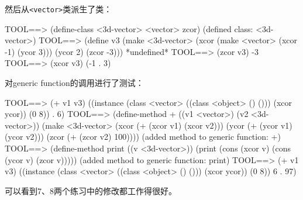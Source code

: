 \documentclass[a4paper]{article}
\newcommand{\code}[1]{\mbox{\tt #1}}
\begin{document}
然后从\code{<vector>}类派生了\code{<3d-vector>}类：

\beginlisp
TOOL==> (define-class <3d-vector> <vector> zcor)
(defined class: <3d-vector>)
\null
TOOL==> (define v3
          (make <3d-vector>
                (xcor (make <vector> (xcor -1) (ycor 3)))
                (ycor 2)
                (zcor -3)))
*undefined*
\null
TOOL==> (zcor v3)
-3
\null
TOOL==> (xcor v3)
(-1 . 3)
\null
\endlisp

对generic function的调用进行了测试：

\beginlisp
\null
TOOL==> (+ v1 v3)
((instance (class <vector> ((class <object> () ())) (xcor ycor)) (0 8)) . 6)
\null
TOOL==> (define-method + ((v1 <vector>) (v2 <3d-vector>))
          (make <3d-vector>
                (xcor (+ (xcor v1) (xcor v2)))
                (ycor (+ (ycor v1) (ycor v2)))
                (zcor (+ (zcor v2) 100))))
(added method to generic function: +)
\null
TOOL==> (define-method print ((v <3d-vector>))
          (print (cons (xcor v) (cons (ycor v) (zcor v)))))
(added method to generic function: print)
\null
TOOL==> (+ v1 v3)
((instance (class <vector> ((class <object> () ())) (xcor ycor)) (0 8)) 6 . 97)
\null
\endlisp

可以看到7、8两个练习中的修改都工作得很好。
\end{document}
